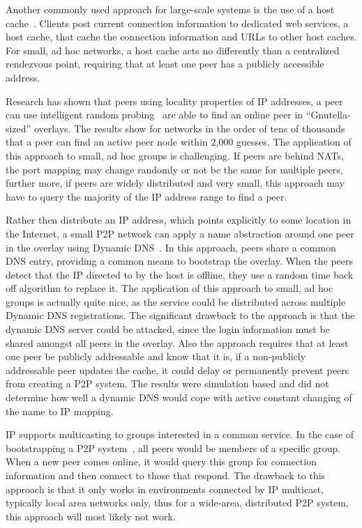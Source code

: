 \documentclass[conference]{IEEEtran}
\begin{document}
Another commonly used approach for large-scale systems is the use of a host
cache~\cite{host_cache}.  Clients post current connection information to
dedicated web services, a host cache, that cache the connection information and
URLs to other host caches.  For small, ad hoc networks, a host cache acts no
differently than a centralized rendezvous point, requiring that at least one
peer has a publicly accessible address.

Research has shown that peers using locality properties of IP addresses, a peer
can use intelligent random probing~\cite{bootstrapping_p2p, locality_aware} are
able to find an online peer in ``Gnutella-sized'' overlays.  The results show
for networks in the order of tens of thousands that a peer can find an active
peer node within 2,000 guesses.  The application of this approach to small, ad
hoc groups is challenging.  If peers are behind NATs, the port mapping may
change randomly or not be the same for multiple peers, further more, if peers
are widely distributed and very small, this approach may have to query the
majority of the IP address range to find a peer.

Rather then distribute an IP address, which points explicitly to some location
in the Internet, a small P2P network can apply a name abstraction around one
peer in the overlay using Dynamic DNS~\cite{bootstrapping_ddns}.  In this
approach, peers share a common DNS entry, providing a common means to bootstrap
the overlay.  When the peers detect that the IP directed to by the host is
offline, they use a random time back off algorithm to replace it.  The
application of this approach to small, ad hoc groups is actually quite nice, as
the service could be distributed across multiple Dynamic DNS registrations.
The significant drawback to the approach is that the dynamic DNS server could
be attacked, since the login information must be shared amongst all peers in
the overlay.  Also the approach requires that at least one peer be publicly
addressable and know that it is, if a non-publicly addressable peer updates the
cache, it could delay or permanently prevent peers from creating a P2P system.
The results were simulation based and did not determine how well a dynamic DNS
would cope with active constant changing of the name to IP mapping.

IP supports multicasting to groups interested in a common service.  In the case
of bootstrapping a P2P system~\cite{pastry, locality_aware}, all peers would be
members of a specific group.  When a new peer comes online, it would query this
group for connection information and then connect to those that respond.  The
drawback to this approach is that it only works in environments connected by IP
multicast, typically local area networks only, thus for a wide-area,
distributed P2P system, this approach will most likely not work.
\end{document}
